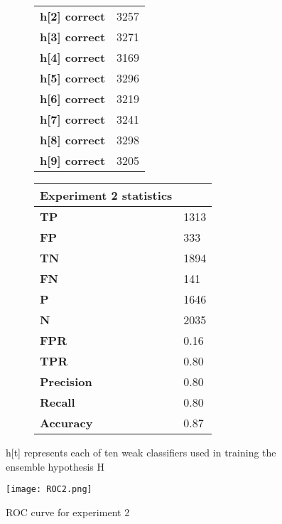 \documentclass[titlepage,11pt]{article}
\begin{document}
{\begin{figure}[h]
\begin{subfigure}[h]{0.3\textwidth}
\begin{tabular}{|l|l|}
        \textbf{ h[2] correct } & 3257 \\
        \textbf{ h[3] correct } & 3271 \\
        \textbf{ h[4] correct } & 3169 \\
        \textbf{ h[5] correct } & 3296 \\
        \textbf{ h[6] correct } & 3219 \\
        \textbf{ h[7] correct } & 3241 \\
        \textbf{ h[8] correct } & 3298 \\
        \textbf{ h[9] correct } & 3205 \\
        \hline
        \end{tabular}
    \end{subfigure}
    \begin{subfigure}[h]{0.3\textwidth}
        \centering
        \begin{tabular}{|l|l|}
        \hline
        \textbf{Experiment 2 statistics} & \\
        \hline
        \textbf{ TP } & 1313 \\
        \textbf{ FP } & 333 \\
        \textbf{ TN } & 1894 \\
        \textbf{ FN } & 141 \\
        \textbf{ P } &  1646 \\
        \textbf{ N } & 2035 \\
        \textbf{ FPR } & 0.16 \\
        \textbf{ TPR } & 0.80 \\
        \hline
        \textbf{ Precision } & 0.80\\
        \textbf{ Recall    } & 0.80\\
        \textbf{ Accuracy  } & 0.87\\
        \hline
        \end{tabular}
    \end{subfigure}
    \caption{h[t] represents each of ten weak classifiers used in training the ensemble hypothesis H}
\end{figure}
\pagebreak
\begin{figure}[h]
\centering
    \texttt{[image: ROC2.png]}
    \caption{ROC curve for experiment 2}
\end{figure}
}
\end{document}
